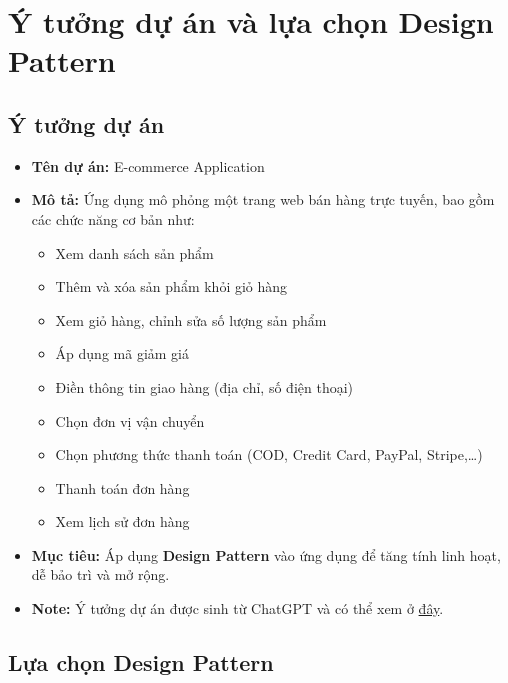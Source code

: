 \section{Ý tưởng dự án và lựa chọn Design Pattern}
\subsection{Ý tưởng dự án}
\begin{itemize}
  \item \textbf{Tên dự án:} E-commerce Application
  \item \textbf{Mô tả:} Ứng dụng mô phỏng một trang web bán hàng trực tuyến, bao gồm các chức năng cơ bản như:
        \begin{itemize}
          \item Xem danh sách sản phẩm
          \item Thêm và xóa sản phẩm khỏi giỏ hàng
          \item Xem giỏ hàng, chỉnh sửa số lượng sản phẩm
          \item Áp dụng mã giảm giá
          \item Điền thông tin giao hàng (địa chỉ, số điện thoại)
          \item Chọn đơn vị vận chuyển
          \item Chọn phương thức thanh toán (COD, Credit Card, PayPal, Stripe,\ldots)
          \item Thanh toán đơn hàng
          \item Xem lịch sử đơn hàng
        \end{itemize}
  \item \textbf{Mục tiêu:} Áp dụng \textbf{Design Pattern} vào ứng dụng để tăng tính linh hoạt, dễ bảo trì và mở rộng.
  \item \textbf{Note:} Ý tưởng dự án được sinh từ ChatGPT và có thể xem ở \href{https://chatgpt.com/share/672878ca-3f94-8000-83fe-afb2a063412d}{đây}.
\end{itemize}
\subsection{Lựa chọn Design Pattern}
